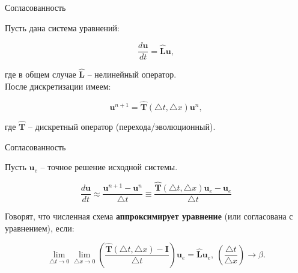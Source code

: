 \documentclass[10pt,xcolor=pst,aspectratio=169]{beamer}
\begin{document}
\begin{frame}{Согласованность}

	\transdissolve[duration=0.1]
	\justifying
	\large

	Пусть дана система уравнений:

    \[
        \frac{d \textbf{u}}{d t} = \hat{\textbf{L}} \textbf{u},
    \]

	
	где в общем случае $\hat{\textbf{L}}$ -- нелинейный оператор.\\

	После дискретизации имеем:

    \[
        \textbf{u}^{n + 1} = \hat{\textbf{T}} (\triangle t, \triangle x) \textbf{u}^{n},
    \]


	где $\hat{\textbf{T}}$ -- дискретный оператор (перехода/эволюционный).

\end{frame}

\begin{frame}{Согласованность}

    \transdissolve[duration=0.1]
    \justifying
    \large

    Пусть $\textbf{u}_{e}$ -- точное решение исходной системы.

    \[
        \frac{d \textbf{u}}{d t} \approx \frac{\textbf{u}^{n + 1} - \textbf{u}^{n}}{\triangle t} \equiv \frac{\hat{\textbf{T}} (\triangle t, \triangle x) \textbf{u}_{e} - \textbf{u}_{e}}{\triangle t}
    \]

    Говорят, что численная схема \textbf{аппроксимирует уравнение} (или согласована с уравнением), если:

\[
        \lim_{\triangle t \rightarrow 0} \lim_{\triangle x \rightarrow 0} \left( \frac{\hat{\textbf{T}} (\triangle t, \triangle x) - \textbf{I}}{\triangle t} \right) \textbf{u}_{e} = \hat{\textbf{L}} \textbf{u}_{e}, \: \left( \frac{\triangle t}{\triangle x} \right) \rightarrow \beta.
    \]



\end{frame}
\end{document}

